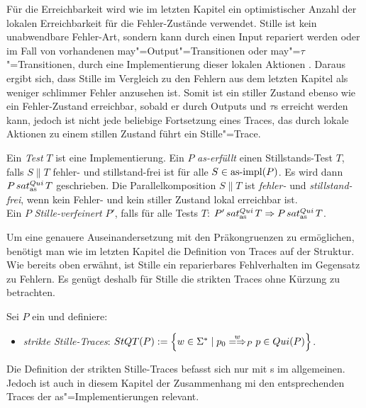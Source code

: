 Für die Erreichbarkeit wird wie im letzten Kapitel ein optimistischer Anzahl
der lokalen Erreichbarkeit für die Fehler-Zustände verwendet. Stille ist kein
unabwendbare \glqq Fehler-Art\grqq{}, sondern kann durch einen Input repariert
werden oder im Fall von vorhandenen may"=Output"=Transitionen oder
may"=$\tau$"=Transitionen, durch eine Implementierung dieser lokalen Aktionen .
Daraus ergibt sich, dass Stille im Vergleich zu den Fehlern aus dem letzten
Kapitel als weniger \glqq schlimmer Fehler\grqq{} anzusehen ist. Somit ist ein
stiller Zustand ebenso wie ein Fehler-Zustand erreichbar, sobald er durch Outputs
und $\tau$s erreicht werden kann, jedoch ist nicht jede beliebige Fortsetzung
eines Traces, das durch lokale Aktionen zu einem stillen Zustand führt ein
Stille"=Trace.

\begin{Def}
  \label{StilleTestDef}
  Ein \emph{Test} $T$ ist eine Implementierung. Ein \MEIO{} $P$
  \emph{as-erfüllt} einen Stillstands-Test $T$, falls $S\|T$ fehler- und
  stillstand-frei ist für alle $S\in \mathrm{as}\text{-}\mathrm{impl} (P)$. Es wird dann $P \hspace{0.05cm}sat_\mathrm{as}^{Qui}\hspace{0.05cm} T$
  geschrieben. Die Parallelkomposition $S\|T$ ist \emph{fehler-} und
  \emph{stillstand-frei}, wenn kein Fehler- und kein stiller Zustand lokal
  erreichbar ist.\\
  Ein \MEIO{} $P$ \emph{Stille-verfeinert} $P'$, falls für alle Tests $T$:
  $P'\hspace{0.05cm}sat_\mathrm{as}^{Qui}\hspace{0.05cm} T \Rightarrow P\hspace{0.05cm}sat_\mathrm{as}^{Qui}\hspace{0.05cm} T$.
\end{Def}

Um eine genauere Auseinandersetzung mit den Präkongruenzen zu ermöglichen,
benötigt man wie im letzten Kapitel die Definition von Traces auf der Struktur.
Wie bereits oben erwähnt, ist Stille ein reparierbares Fehlverhalten im
Gegensatz zu Fehlern. Es genügt deshalb für Stille die strikten Traces ohne
Kürzung zu betrachten.

\begin{Def}
  \label{StilleTraceDef}
  Sei $P$ ein \MEIO{} und definiere:
  \begin{itemize}
    \item \emph{strikte Stille-Traces}: $\StQT (P) := \left\{w\in\Sigma ^*\mid
      p_0 \weakmay[w]_P p\in Qui(P)\right\}$.
  \end{itemize}
\end{Def}

Die Definition der strikten Stille-Traces befasst sich nur mit \MEIO{}s im
allgemeinen. Jedoch ist auch in diesem Kapitel der Zusammenhang mi den
entsprechenden Traces der as"=Implementierungen relevant.

